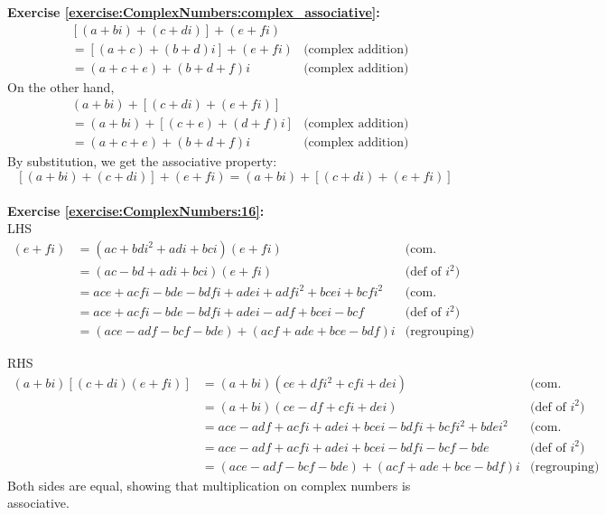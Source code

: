 \noindent\textbf{Exercise \ref{exercise:ComplexNumbers:complex_associative}:}
\begin{align*}
& [(a + bi) + (c + di)] + (e + fi) &\\
&=[(a + c) + (b + d)i] + (e + fi) &\text{(complex addition)}\\
&= (a + c + e) + (b + d + f)i &\text{(complex addition)}
\end{align*}
On the other hand,
\begin{align*}
&(a + bi) + [(c + di) + (e + fi)]&\\
 &= (a + bi) + [(c + e) + (d + f)i] &\text{(complex addition)}\\
&= (a + c + e) + (b + d + f)i &\text{(complex addition)}
\end{align*}
By substitution, we get the associative property:
\[[(a + bi) + (c + di)] + (e + fi) = (a + bi) + [(c + di) + (e + fi)] \] \\

\noindent\textbf{Exercise \ref{exercise:ComplexNumbers:16}:}
\\
LHS
\begin{align*}
[(a + bi)(c + di)](e + fi) &= (ac + bdi^{2} + adi + bci)(e + fi) &\text{(com. multi.)}\\
&= (ac - bd + adi + bci)(e + fi) &\text{(def of } i^{2})\\
&= ace + acfi - bde - bdfi + adei + adfi^{2} + bcei + bcfi^{2} &\text{(com. multi.)}\\
&= ace + acfi - bde - bdfi + adei - adf + bcei - bcf &\text{(def of } i^{2})\\
&= (ace - adf - bcf - bde) + (acf + ade + bce - bdf)i  &\text{(regrouping)}
\end{align*}

\noindent RHS
\begin{align*}
(a + bi)[(c + di)(e + fi)] &= (a + bi)(ce + dfi^{2} + cfi + dei) &\text{(com. multi.)}\\
&= (a + bi)(ce - df + cfi + dei) &\text{(def of } i^{2})\\
&= ace - adf + acfi + adei + bcei - bdfi + bcfi^{2} + bdei^{2} &\text{(com. multi.)}\\
&= ace - adf + acfi + adei + bcei - bdfi - bcf - bde &\text{(def of } i^{2})\\
&= (ace - adf - bcf - bde) + (acf + ade + bce - bdf)i  &\text{(regrouping)}
\end{align*}
Both sides are equal, showing that multiplication on complex numbers is associative.\\

